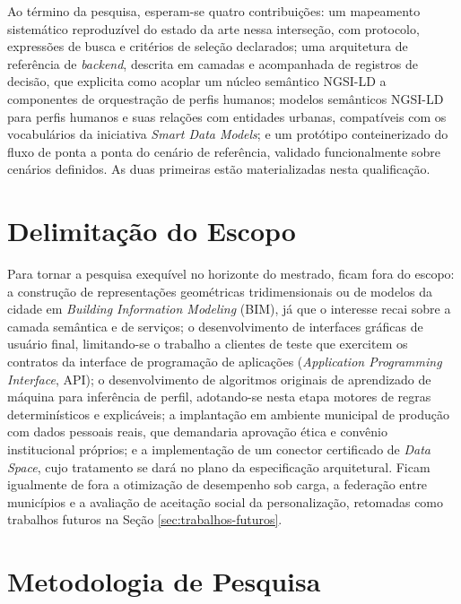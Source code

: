 Ao término da pesquisa, esperam-se quatro contribuições: um mapeamento sistemático reproduzível do estado da arte nessa interseção, com protocolo, expressões de busca e critérios de seleção declarados; uma arquitetura de referência de \textit{backend}, descrita em camadas e acompanhada de registros de decisão, que explicita como acoplar um núcleo semântico NGSI-LD a componentes de orquestração de perfis humanos; modelos semânticos NGSI-LD para perfis humanos e suas relações com entidades urbanas, compatíveis com os vocabulários da iniciativa \textit{Smart Data Models}; e um protótipo conteinerizado do fluxo de ponta a ponta do cenário de referência, validado funcionalmente sobre cenários definidos. As duas primeiras estão materializadas nesta qualificação.

\section{Delimitação do Escopo}
\label{sec:escopo}

Para tornar a pesquisa exequível no horizonte do mestrado, ficam fora do escopo: a construção de representações geométricas tridimensionais ou de modelos da cidade em \textit{Building Information Modeling} (BIM), já que o interesse recai sobre a camada semântica e de serviços; o desenvolvimento de interfaces gráficas de usuário final, limitando-se o trabalho a clientes de teste que exercitem os contratos da interface de programação de aplicações (\textit{Application Programming Interface}, API); o desenvolvimento de algoritmos originais de aprendizado de máquina para inferência de perfil, adotando-se nesta etapa motores de regras determinísticos e explicáveis; a implantação em ambiente municipal de produção com dados pessoais reais, que demandaria aprovação ética e convênio institucional próprios; e a implementação de um conector certificado de \textit{Data Space}, cujo tratamento se dará no plano da especificação arquitetural. Ficam igualmente de fora a otimização de desempenho sob carga, a federação entre municípios e a avaliação de aceitação social da personalização, retomadas como trabalhos futuros na Seção \ref{sec:trabalhos-futuros}.

\section{Metodologia de Pesquisa}
\label{sec:metodologia-geral}

